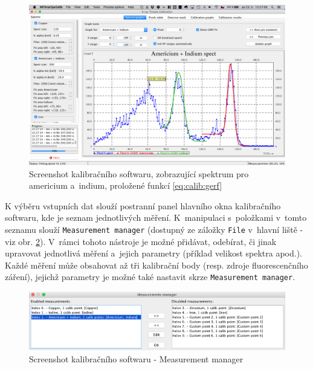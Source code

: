 \begin{figure}[t]
	\begin{center}
		\includegraphics[width=15cm]{figures/calibsw_spectra_all.png}
		\caption{Screenshot kalibračního softwaru, zobrazující spektrum pro americium a~indium, proložené funkcí \ref{eq:calib:gerf}}
		\label{fig:calib:sw_spektra}
	\end{center}
\end{figure}

K výběru vstupních dat slouží postranní panel hlavního okna kalibračního softwaru, kde je seznam jednotlivých měření. K~manipulaci s~položkami v~tomto seznamu slouží \texttt{Measurement manager} (dostupný ze záložky \texttt{File} v~hlavní liště - viz obr. \ref{fig:calib:sw_measurmanag}). V~rámci tohoto nástroje je možné přidávat, odebírat, či jinak upravovat jednotlivá měření a~jejich parametry (příklad velikost spektra apod.). Každé měření může obsahovat až tři kalibrační body (resp. zdroje fluorescenčního záření), jejichž parametry je možné také nastavit skrze \texttt{Measurement manager}.

\begin{figure}[th!]
	\begin{center}
		\includegraphics[width=15cm]{figures/calibsw_manager.png}
		\caption{Screenshot kalibračního softwaru - Measurement manager}
		\label{fig:calib:sw_measurmanag}
	\end{center}
\end{figure}

